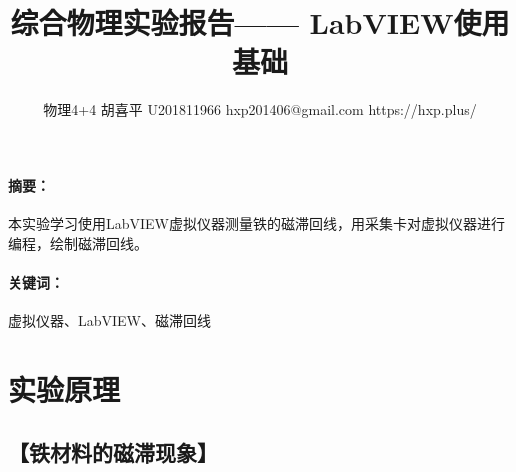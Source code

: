 \documentclass{ctexart}
\date{}
\newcommand{\generatetitle}[6]{\title{\zihao{3}\heiti#1} \author{#2 \quad
    \quad #3 \quad\quad #4 \quad\quad #5 \quad\quad #6} \maketitle\thispagestyle{fancy}}
\let\oldsubsection\subsection
\renewcommand{\subsection}[1]{\oldsubsection{\!\!\!\!\!\!【#1】}}
\let\oldparagraph\paragraph
\renewcommand{\paragraph}[1]{\oldparagraph{#1：\!\!\!\!\!\!}}
\begin{document}
\generatetitle{综合物理实验报告——
  LabVIEW使用基础}{物理4+4}{胡喜平}{U201811966}{hxp201406@gmail.com}{https://hxp.plus/}

\paragraph{摘要}
本实验学习使用LabVIEW虚拟仪器测量铁的磁滞回线，用采集卡对虚拟仪器进行编程，绘制磁滞回线。

\paragraph{关键词}
虚拟仪器、LabVIEW、磁滞回线

\section{实验原理}
\subsection{铁材料的磁滞现象}
\end{document}
